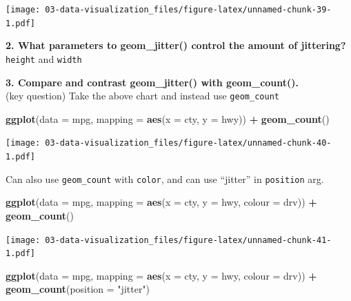 \documentclass[]{book}
\newenvironment{Shaded}{\begin{snugshade}}{\end{snugshade}}
\newcommand{\DataTypeTok}[1]{\textcolor[rgb]{0.13,0.29,0.53}{#1}}
\newcommand{\KeywordTok}[1]{\textcolor[rgb]{0.13,0.29,0.53}{\textbf{#1}}}
\newcommand{\NormalTok}[1]{#1}
\newcommand{\OperatorTok}[1]{\textcolor[rgb]{0.81,0.36,0.00}{\textbf{#1}}}
\newcommand{\StringTok}[1]{\textcolor[rgb]{0.31,0.60,0.02}{#1}}
\theoremstyle{definition}
\theoremstyle{definition}
\theoremstyle{definition}
\theoremstyle{remark}
\begin{document}
\texttt{[image: 03-data-visualization\_files/figure-latex/unnamed-chunk-39-1.pdf]}

\textbf{2. What parameters to geom\_jitter() control the amount of
jittering?}\\
\texttt{height} and \texttt{width}

\textbf{3. Compare and contrast geom\_jitter() with geom\_count().}\\
(key question) Take the above chart and instead use \texttt{geom\_count}

\begin{Shaded}
\begin{Highlighting}[]
\KeywordTok{ggplot}\NormalTok{(}\DataTypeTok{data =}\NormalTok{ mpg, }\DataTypeTok{mapping =} \KeywordTok{aes}\NormalTok{(}\DataTypeTok{x =}\NormalTok{ cty, }\DataTypeTok{y =}\NormalTok{ hwy)) }\OperatorTok{+}\StringTok{ }
\StringTok{  }\KeywordTok{geom_count}\NormalTok{()}
\end{Highlighting}
\end{Shaded}

\texttt{[image: 03-data-visualization\_files/figure-latex/unnamed-chunk-40-1.pdf]}

Can also use \texttt{geom\_count} with \texttt{color}, and can use
``jitter'' in \texttt{position} arg.

\begin{Shaded}
\begin{Highlighting}[]
\KeywordTok{ggplot}\NormalTok{(}\DataTypeTok{data =}\NormalTok{ mpg, }\DataTypeTok{mapping =} \KeywordTok{aes}\NormalTok{(}\DataTypeTok{x =}\NormalTok{ cty, }\DataTypeTok{y =}\NormalTok{ hwy, }\DataTypeTok{colour =}\NormalTok{ drv)) }\OperatorTok{+}\StringTok{ }
\StringTok{  }\KeywordTok{geom_count}\NormalTok{()}
\end{Highlighting}
\end{Shaded}

\texttt{[image: 03-data-visualization\_files/figure-latex/unnamed-chunk-41-1.pdf]}

\begin{Shaded}
\begin{Highlighting}[]
\KeywordTok{ggplot}\NormalTok{(}\DataTypeTok{data =}\NormalTok{ mpg, }\DataTypeTok{mapping =} \KeywordTok{aes}\NormalTok{(}\DataTypeTok{x =}\NormalTok{ cty, }\DataTypeTok{y =}\NormalTok{ hwy, }\DataTypeTok{colour =}\NormalTok{ drv)) }\OperatorTok{+}\StringTok{ }
\StringTok{  }\KeywordTok{geom_count}\NormalTok{(}\DataTypeTok{position =} \StringTok{"jitter"}\NormalTok{)}
\end{Highlighting}
\end{Shaded}
\end{document}
